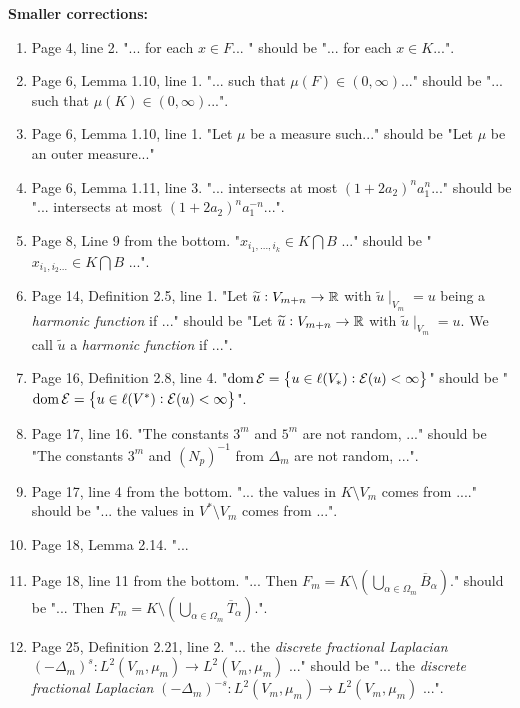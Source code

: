 \vspace{1em}
\noi \textbf{\Large Smaller corrections:}
\begin{enumerate}
	\item Page 4, line 2. "... for each $x \in F$... " should be "... for each $x \in K$...".
	\item Page 6, Lemma 1.10, line 1. "... such that $\mu(F) \in (0, \infty)$..." should be "... such that $\mu(K) \in (0, \infty)$...".
	\item Page 6, Lemma 1.10, line 1. "Let $\mu$ be a measure such..." should be "Let $\mu$ be an outer measure..."
	\item Page 6, Lemma 1.11, line 3. "... intersects at most $(1+2a_2)^{n}a_{1}^{n}$..." should be "... intersects at most $(1+2a_2)^{n}a_{1}^{-n}$...".
	\item Page 8, Line 9 from the bottom. "$x_{i_{1}, \ldots, i_{k}} \in K \bigcap B$ ..." should be "$x_{i_{1},i_{2} \ldots} \in K \bigcap B$ ...".
	\item Page 14, Definition 2.5, line 1. "Let $\widetilde{u}: V_{m+n} \to \mathbb{R}$ with $\widetilde{u}\mid_{V_m} =u$ being a \emph{harmonic function} if ..." should be "Let $\widetilde{u}: V_{m+n} \to \mathbb{R}$ with $\widetilde{u}\mid_{V_m} =u$. We call $\widetilde{u}$ a \emph{harmonic function} if ...".
	\item Page 16, Definition 2.8, line 4. "$\dom \mathcal{E} = \cbr{u \in \ell(V_{*}) : \mathcal{E}(u) < \infty}$" should be "$\dom \mathcal{E} = \cbr{u \in \ell(V^{*}) : \mathcal{E}(u) < \infty}$".
	\item Page 17, line 16. "The constants $3^{m}$ and $5^{m}$ are not random, ..." should be "The constants $3^{m}$ and $(N_p)^{-1}$ from $\Delta_{m}$ are not random, ...".
	\item Page 17, line 4 from the bottom. "... the values in $K \setminus V_m$ comes from ...." should be "... the values in $V^{*} \setminus V_m$ comes from ...".
	\item Page 18, Lemma 2.14. "...
	\item Page 18, line 11 from the bottom. "... Then $F_m = K \setminus \left(\bigcup_{\alpha \in \Omega_m} \overline{B}_{\alpha} \right)$." should be "... Then $F_m = K \setminus \left(\bigcup_{\alpha \in \Omega_m} \overline{T}_{\alpha} \right)$.".
	\item Page 25, Definition 2.21, line 2. "... the \emph{discrete fractional Laplacian} \nl $(-\Delta_m)^{s}\colon L^{2}(V_m, \mu_m) \to L^{2}(V_m, \mu_m)$ ..." should be "... the \emph{discrete fractional Laplacian} \nl $(-\Delta_m)^{-s}\colon L^{2}(V_m, \mu_m) \to L^{2}(V_m, \mu_m)$ ...".

\end{enumerate}
